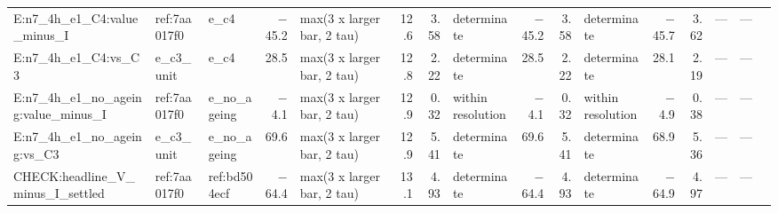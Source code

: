 \begin{table}[htbp]
\begin{tabular}{lllrlrrlrrlrrrrl}
E:n7\_4h\_e1\_C4:value\_minus\_I & ref:7aa017f0 & e\_c4 & $-$45.2 & max(3 x larger bar, 2 tau) & 12.6 & 3.58 & determinate & $-$45.2 & 3.58 & determinate & $-$45.7 & 3.62 & --- & --- &  \\
E:n7\_4h\_e1\_C4:vs\_C3 & e\_c3\_unit & e\_c4 & 28.5 & max(3 x larger bar, 2 tau) & 12.8 & 2.22 & determinate & 28.5 & 2.22 & determinate & 28.1 & 2.19 & --- & --- &  \\
E:n7\_4h\_e1\_no\_ageing:value\_minus\_I & ref:7aa017f0 & e\_no\_ageing & $-$4.1 & max(3 x larger bar, 2 tau) & 12.9 & 0.32 & within resolution & $-$4.1 & 0.32 & within resolution & $-$4.9 & 0.38 & --- & --- &  \\
E:n7\_4h\_e1\_no\_ageing:vs\_C3 & e\_c3\_unit & e\_no\_ageing & 69.6 & max(3 x larger bar, 2 tau) & 12.9 & 5.41 & determinate & 69.6 & 5.41 & determinate & 68.9 & 5.36 & --- & --- &  \\
CHECK:headline\_V\_minus\_I\_settled & ref:7aa017f0 & ref:bd504ecf & $-$64.4 & max(3 x larger bar, 2 tau) & 13.1 & 4.93 & determinate & $-$64.4 & 4.93 & determinate & $-$64.9 & 4.97 & --- & --- &  \\
\bottomrule
\end{tabular}
\end{table}

